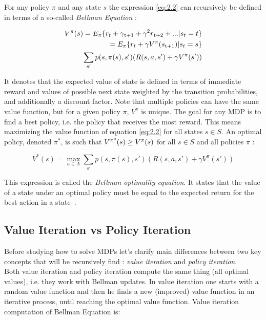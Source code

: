 For any policy $\pi$ and any state $s$ the expression \ref{eq:2.2} can recursively be defined in terms of a so-called \textit{Bellman Equation} :

\begin{equation}
\begin{split}
	V^\pi (s) = E_\pi\{r_t + \gamma\textsubscript{t+1} + \gamma^2 r\textsubscript{t+2} + ... | s_t = t\} \\
	= E_\pi \{r_t + \gamma V^\pi(s\textsubscript{t+1}) | s_t = s\} \\
	\sum_{s'}p(s, \pi(s), s') (R(s, a, s') + \gamma V^\pi (s'))
\end{split}	
\end{equation}

It denotes that the expected value of state is defined in terms of immediate reward and values of possible next state weighted by the transition probabilities, and additionally a discount factor. Note that multiple policies can have the same value function, but for a given policy $\pi$, $V^\pi$ is unique. The goal for any MDP is to find a best policy, i.e. the policy that receives the most reward. This means maximizing the value function of equation \ref{eq:2.2} for all states $s \in S$. An optimal policy, denoted $\pi^*$, is such that $V\textsuperscript{$\pi$*} (s) \geq V^\pi (s)$ for all $s \in S$ and all policies $\pi$ :

\begin{equation} 
\label{eq:2.5}
V^*(s) = \max_{a \in A} \sum_{s'}p(s, \pi(s), s') (R(s, a, s') + \gamma V^\pi (s'))
\end{equation}

This expression is called the \textit{Bellman optimality equation}. It states that the value of a state under an optimal policy must be equal to the expected return for the best action in a state~\cite{wiering2012reinforcement}.

\subsection{Value Iteration vs Policy Iteration} Before studying how to solve MDPs let's clarify main differences between two key concepts that will be recursively find : \textit{value iteration} and \textit{policy iteration}. \\

Both value iteration and policy iteration compute the same thing (all optimal values), i.e. they work with Bellman updates. In value iteration one starts with a random value function and then he finds a new (improved) value function in an iterative process, until reaching the optimal value function. Value iteration computation of Bellman Equation is:

